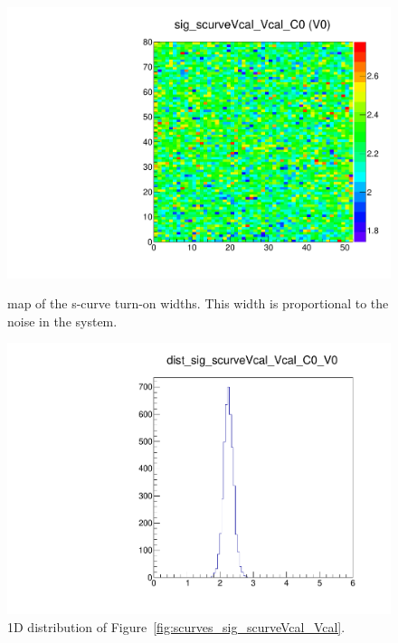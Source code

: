\begin{figure}[!Hp]
\centering
\begin{minipage}{0.45\textwidth}
  \includegraphics[width=1.0\textwidth]{figures/scurves_sig_scurveVcal_Vcal.pdf}
  \caption{\roc map of the \vcal s-curve turn-on widths.  
  This width is proportional to the noise in the system.}
  \label{fig:scurves_sig_scurveVcal_Vcal}
\end{minipage}
\hspace{0.3cm}
\begin{minipage}{0.45\textwidth}
  \includegraphics[width=1.0\textwidth]{figures/scurves_dist_sig_scurveVcal_Vcal.pdf}
  \caption{1D distribution of Figure~\ref{fig:scurves_sig_scurveVcal_Vcal}.}
  \label{fig:scurves_dist_sig_scurveVcal_Vcal}
\end{minipage}
\end{figure}

